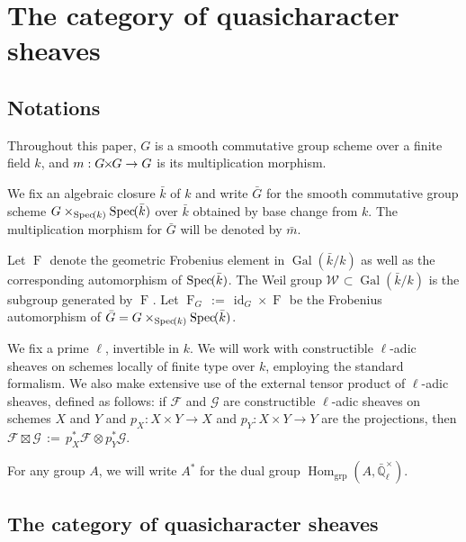 \documentclass{amsart}
\theoremstyle{plain}
\theoremstyle{definition}
\theoremstyle{remark}
\newcommand{\EE}{\mathbb{\bar Q}_\ell}
\newcommand{\bFq}{\bar{k}}
\newcommand{\Fq}{k}
\newcommand{\EEx}{\EE^\times}
\newcommand{\Weil}[1]{\mathcal{W}_{#1}}
\DeclareMathOperator{\Gal}{Gal}
\newcommand{\Frob}[1]{\operatorname{F}_{#1}}
\DeclareMathOperator{\Hom}{Hom}
\DeclareMathOperator{\id}{id}
\newcommand{\Spec}[1]{{\operatorname{Spec}\hskip-1pt( #1 )}}
\newcommand{\ceq}{{\, :=\, }}
\newcommand{\bm}{\bar{m}}
\newcommand{\bG}{\bar{G}}
\newcommand{\tight}[3]{\hspace{-#1pt}{#2}\hspace{-#3pt}}
\newcommand{\GxG}{\text{$G \tight{1}{\times}{1} G$}}
\begin{document}

\tableofcontents

\section{The category of quasicharacter sheaves}


\subsection{Notations}\label{sec:notation}

Throughout this paper, $G$ is a smooth commutative group scheme
over a finite field $\Fq$, and $m : \GxG\to G$ is its multiplication morphism.

We fix an algebraic closure $\bFq$ of $\Fq$ and write $\bG$ for the
smooth commutative group scheme $G \times_{\Spec{\Fq}} \Spec{\bFq}$ over $\bFq$
obtained by base change from $k$. The multiplication morphism for $\bG$ will be denoted by $\bm$.

Let $\Frob{}$ denote the geometric Frobenius element in $\Gal(\bFq/\Fq)$ as
well as the corresponding automorphism of $\Spec{\bFq}$. The Weil group
$\Weil{}\subset \Gal(\bFq/\Fq)$ is the subgroup generated by $\Frob{}$.
Let $\Frob{G} \ceq \id_{G} \times \Frob{}$ be the Frobenius automorphism of $\bG = G \times_{\Spec{\Fq}} \Spec{\bFq}$.

We fix a prime $\ell$, invertible in $\Fq$.
We will work with constructible $\ell$-adic sheaves 
on schemes locally of finite type over $\Fq$, employing the standard formalism.
We also make extensive use of the external tensor product of $\ell$-adic sheaves,
defined as follows: if $\mathcal{F}$ and $\mathcal{G}$ are constructible $\ell$-adic
sheaves on schemes $X$ and $Y$ and $p_X : X\times Y\to X$ and $p_Y : X\times Y \to Y$
are the projections, then $\mathcal{F}\boxtimes \mathcal{G} \ceq p_X^* \mathcal{F} \otimes p_Y^*\mathcal{G}$.

For any group $A$, we will write $A^*$ for the dual group $\Hom_\text{grp}(A, \EEx)$.

\subsection{The category of quasicharacter sheaves}\label{sec:category}
\end{document}
